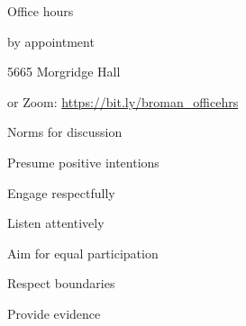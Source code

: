 \documentclass[aspectratio=169,12pt,t]{beamer}
\begin{document}
\begin{frame}{Office hours}

  \bbi
\item {\hilit by appointment}
\item 5665 Morgridge Hall
\item or Zoom: \url{https://bit.ly/broman_officehrs}
\ei

\end{frame}






\begin{frame}{Norms for discussion}

      \bbi
    \item Presume positive intentions
    \item Engage respectfully
    \item Listen attentively
    \item Aim for equal participation
    \item Respect boundaries
    \item Provide evidence
      \ei

\end{frame}
\end{document}

